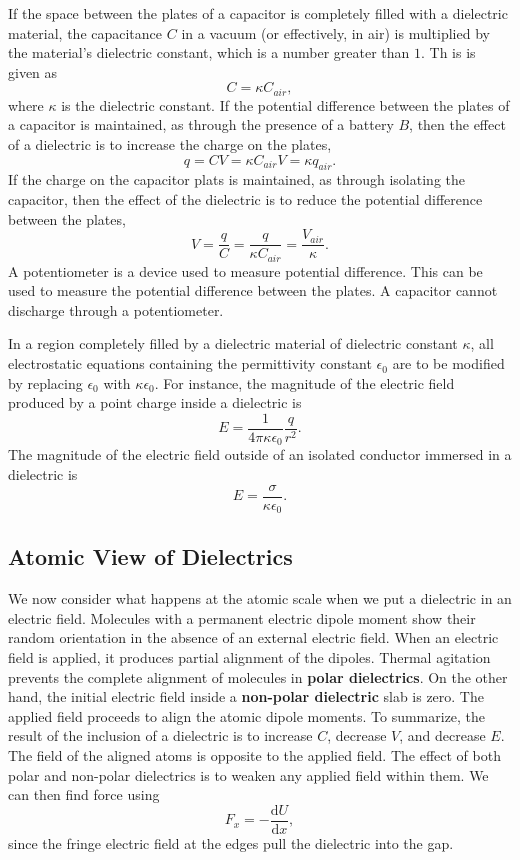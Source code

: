 \documentclass[11pt]{article}
\theoremstyle{plain} %
\theoremstyle{definition}
\theoremstyle{example}
\theoremstyle{remark}
\begin{document}
If the space between the plates of a capacitor is completely filled with a dielectric material, the capacitance $C$ in a vacuum (or effectively, in air) is multiplied by the material's dielectric constant, which is a number greater than $1$. Th is is given as 
$$C  = \kappa C_{air},$$
where $\kappa$ is the dielectric constant. If the potential difference between the plates of a capacitor is maintained, as through the presence of a battery $B$, then the effect of a dielectric is to increase the charge on the plates,
$$q = CV = \kappa C_{air}V = \kappa q_{air}.$$
If the charge on the capacitor plats is maintained, as through isolating the capacitor, then the effect of the dielectric is to reduce the potential difference between the plates, 
$$V = \frac{q}{C} = \frac{q}{\kappa C_{air}} = \frac{V_{air}}{\kappa}.$$ A potentiometer is a device used to measure potential difference. This can be used to measure the potential difference between the plates. A capacitor cannot discharge through a potentiometer. 

In a region completely filled by a dielectric material of dielectric constant $\kappa$, all electrostatic equations containing the permittivity constant $\epsilon_0$ are to be modified by replacing $\epsilon_0$ with $\kappa\epsilon_0$. For instance, the magnitude of the electric field produced by a point charge inside a dielectric is 
$$E = \frac{1}{4\pi\kappa\epsilon_0}\frac{q}{r^2}.
$$ The magnitude of the electric field outside of an isolated conductor immersed in a dielectric is 
$$E = \frac{\sigma}{\kappa \epsilon_0}.$$

\subsection{Atomic View of Dielectrics}

We now consider what happens at the atomic scale when we put a dielectric in an electric field. Molecules with a permanent electric dipole moment show their random orientation in the absence of an external electric field. When an electric field is applied, it produces partial alignment of the dipoles. Thermal agitation prevents the complete alignment of molecules in \textbf{polar dielectrics}. On the other hand, the initial electric field inside a \textbf{non-polar dielectric} slab is zero. The applied field proceeds to align the atomic dipole moments. To summarize, the result of the inclusion of a dielectric is to increase $C$, decrease $V$, and decrease $E$. The field of the aligned atoms is opposite to the applied field. The effect of both polar and non-polar dielectrics is to weaken any applied field within them. We can then find force using 
$$F_x = -\frac{\mathrm d U}{\mathrm d x},$$
since the fringe electric field at the edges pull the dielectric into the gap. 
\end{document}
